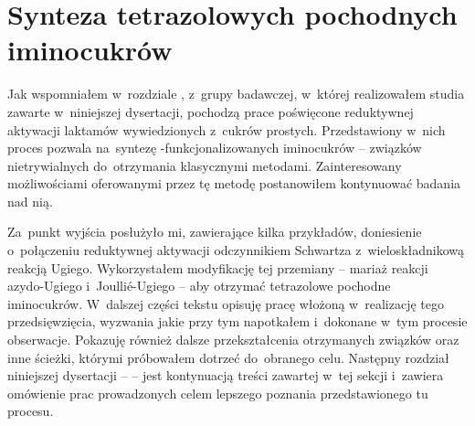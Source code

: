 \section{Synteza tetrazolowych pochodnych iminocukrów}\label{synthesis:sugars}
Jak wspomniałem w~rozdziale \textit{}, z~grupy badawczej, w~której realizowałem studia zawarte w~niniejszej dysertacji,
  pochodzą prace poświęcone reduktywnej aktywacji laktamów wywiedzionych z~cukrów prostych.
Przedstawiony w~nich proces pozwala na~syntezę \textalpha{}-funkcjonalizowanych iminocukrów
  \--- związków nietrywialnych do~otrzymania klasycznymi metodami.
Zainteresowany możliwościami oferowanymi przez tę metodę postanowiłem kontynuować badania nad nią.

Za~punkt wyjścia posłużyło mi, zawierające kilka przykładów, doniesienie o~połączeniu
  reduktywnej aktywacji odczynnikiem Schwartza z~wieloskładnikową reakcją Ugiego.
Wykorzystałem modyfikację tej przemiany \--- mariaż reakcji azydo-Ugiego i~Joulli{\'e}-Ugiego \---
  aby otrzymać tetrazolowe pochodne iminocukrów.
W~dalszej części tekstu opisuję pracę włożoną w~realizację tego przedsięwzięcia,
  wyzwania jakie przy tym napotkałem i~dokonane w~tym procesie obserwacje.
Pokazuję również dalsze przekształcenia otrzymanych związków oraz inne ścieżki,
  którymi próbowałem dotrzeć do~obranego celu.
Następny rozdział niniejszej dysertacji \--- \textit{} \---
  jest kontynuacją treści zawartej w~tej sekcji i~zawiera omówienie prac prowadzonych
  celem lepszego poznania przedstawionego tu procesu.

